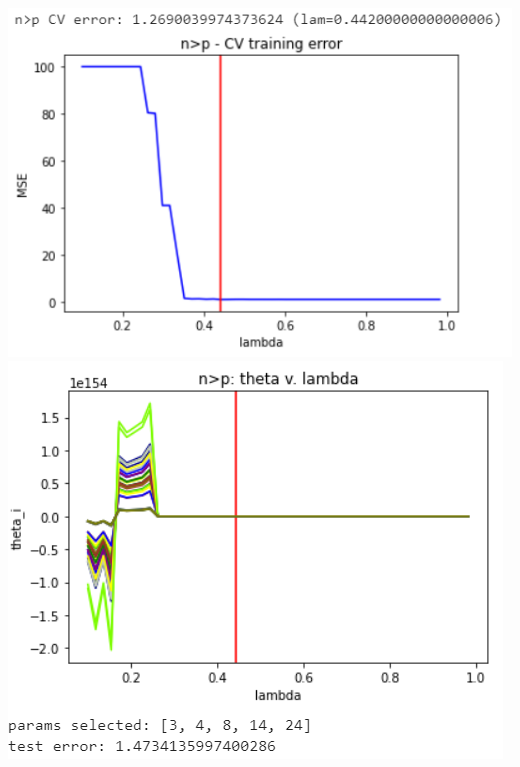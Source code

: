 \documentclass[11pt]{article}
\begin{document}
\begin{center}
\includegraphics[scale=0.7]{charts/ridge_q_corr_n_gt_p_err.PNG}
\includegraphics[scale=0.7]{charts/ridge_q_corr_n_gt_p_thetas.PNG}


\end{center}
\end{document}
